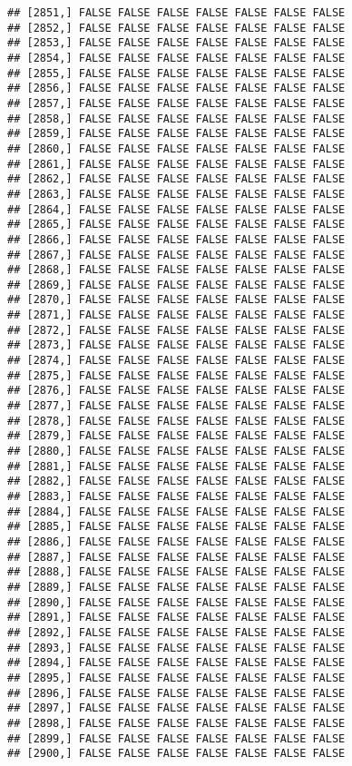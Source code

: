 \documentclass[
]{article}
\begin{document}
\begin{verbatim}
## [2851,] FALSE FALSE FALSE FALSE FALSE FALSE FALSE
## [2852,] FALSE FALSE FALSE FALSE FALSE FALSE FALSE
## [2853,] FALSE FALSE FALSE FALSE FALSE FALSE FALSE
## [2854,] FALSE FALSE FALSE FALSE FALSE FALSE FALSE
## [2855,] FALSE FALSE FALSE FALSE FALSE FALSE FALSE
## [2856,] FALSE FALSE FALSE FALSE FALSE FALSE FALSE
## [2857,] FALSE FALSE FALSE FALSE FALSE FALSE FALSE
## [2858,] FALSE FALSE FALSE FALSE FALSE FALSE FALSE
## [2859,] FALSE FALSE FALSE FALSE FALSE FALSE FALSE
## [2860,] FALSE FALSE FALSE FALSE FALSE FALSE FALSE
## [2861,] FALSE FALSE FALSE FALSE FALSE FALSE FALSE
## [2862,] FALSE FALSE FALSE FALSE FALSE FALSE FALSE
## [2863,] FALSE FALSE FALSE FALSE FALSE FALSE FALSE
## [2864,] FALSE FALSE FALSE FALSE FALSE FALSE FALSE
## [2865,] FALSE FALSE FALSE FALSE FALSE FALSE FALSE
## [2866,] FALSE FALSE FALSE FALSE FALSE FALSE FALSE
## [2867,] FALSE FALSE FALSE FALSE FALSE FALSE FALSE
## [2868,] FALSE FALSE FALSE FALSE FALSE FALSE FALSE
## [2869,] FALSE FALSE FALSE FALSE FALSE FALSE FALSE
## [2870,] FALSE FALSE FALSE FALSE FALSE FALSE FALSE
## [2871,] FALSE FALSE FALSE FALSE FALSE FALSE FALSE
## [2872,] FALSE FALSE FALSE FALSE FALSE FALSE FALSE
## [2873,] FALSE FALSE FALSE FALSE FALSE FALSE FALSE
## [2874,] FALSE FALSE FALSE FALSE FALSE FALSE FALSE
## [2875,] FALSE FALSE FALSE FALSE FALSE FALSE FALSE
## [2876,] FALSE FALSE FALSE FALSE FALSE FALSE FALSE
## [2877,] FALSE FALSE FALSE FALSE FALSE FALSE FALSE
## [2878,] FALSE FALSE FALSE FALSE FALSE FALSE FALSE
## [2879,] FALSE FALSE FALSE FALSE FALSE FALSE FALSE
## [2880,] FALSE FALSE FALSE FALSE FALSE FALSE FALSE
## [2881,] FALSE FALSE FALSE FALSE FALSE FALSE FALSE
## [2882,] FALSE FALSE FALSE FALSE FALSE FALSE FALSE
## [2883,] FALSE FALSE FALSE FALSE FALSE FALSE FALSE
## [2884,] FALSE FALSE FALSE FALSE FALSE FALSE FALSE
## [2885,] FALSE FALSE FALSE FALSE FALSE FALSE FALSE
## [2886,] FALSE FALSE FALSE FALSE FALSE FALSE FALSE
## [2887,] FALSE FALSE FALSE FALSE FALSE FALSE FALSE
## [2888,] FALSE FALSE FALSE FALSE FALSE FALSE FALSE
## [2889,] FALSE FALSE FALSE FALSE FALSE FALSE FALSE
## [2890,] FALSE FALSE FALSE FALSE FALSE FALSE FALSE
## [2891,] FALSE FALSE FALSE FALSE FALSE FALSE FALSE
## [2892,] FALSE FALSE FALSE FALSE FALSE FALSE FALSE
## [2893,] FALSE FALSE FALSE FALSE FALSE FALSE FALSE
## [2894,] FALSE FALSE FALSE FALSE FALSE FALSE FALSE
## [2895,] FALSE FALSE FALSE FALSE FALSE FALSE FALSE
## [2896,] FALSE FALSE FALSE FALSE FALSE FALSE FALSE
## [2897,] FALSE FALSE FALSE FALSE FALSE FALSE FALSE
## [2898,] FALSE FALSE FALSE FALSE FALSE FALSE FALSE
## [2899,] FALSE FALSE FALSE FALSE FALSE FALSE FALSE
## [2900,] FALSE FALSE FALSE FALSE FALSE FALSE FALSE

\end{verbatim}
\end{document}
